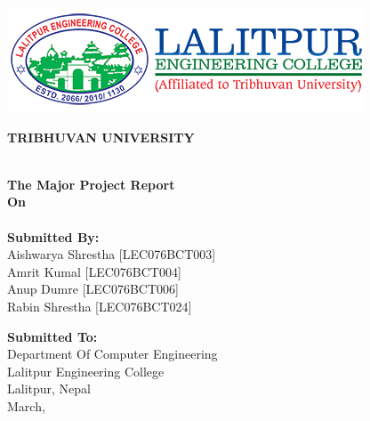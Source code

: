 \thispagestyle{empty}
\begin{center}
\begin{spacing}{1.6}

\includegraphics[scale=0.8]{img/Graphics/leclogo21.png}

\vspace{10pt}
\textbf{
\large{TRIBHUVAN UNIVERSITY}\\
\MakeUppercase{\large{\theinstitute}}\\
\MakeUppercase{\large{\thecampus}}}

\vspace{1cm}

\textbf{The 
Major Project Report\\
On}\\
\textbf{\thetitle}\\
\vspace{33pt} 
\textbf{Submitted By:} \\ 
 
Aishwarya Shrestha [LEC076BCT003]\\
Amrit Kumal        [LEC076BCT004]\\
Anup Dumre         [LEC076BCT006]\\
Rabin Shrestha     [LEC076BCT024]\\   
 
 
 \vspace{33pt}

\textbf{Submitted To:}\\
Department Of Computer Engineering\\
Lalitpur Engineering College\\
Lalitpur, Nepal\\


\vspace{33pt}
 March, \the\year

\vspace{1cm}


 
\end{spacing}
\end{center}

\clearpage